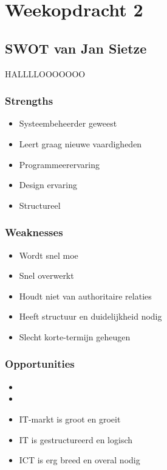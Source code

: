 
\chapter{Weekopdracht 2}

\section{SWOT van Jan Sietze}

HALLLLOOOOOOO

\subsection{Strengths}

\begin{itemize}
\item
  Systeembeheerder geweest
\item
  Leert graag nieuwe vaardigheden
\item
  Programmeerervaring
\item
  Design ervaring
\item
  Structureel
\end{itemize}

\subsection{Weaknesses}

\begin{itemize}
\item
  Wordt snel moe
\item
  Snel overwerkt
\item
  Houdt niet van authoritaire relaties
\item
  Heeft structuur en duidelijkheid nodig
\item
  Slecht korte-termijn geheugen
\end{itemize}

\subsection{Opportunities}

\begin{itemize}
\item
  
\item
   
\item
  IT-markt is groot en groeit
\item
  IT is gestructureerd en logisch
\item
  ICT is erg breed en overal nodig
\end{itemize}


